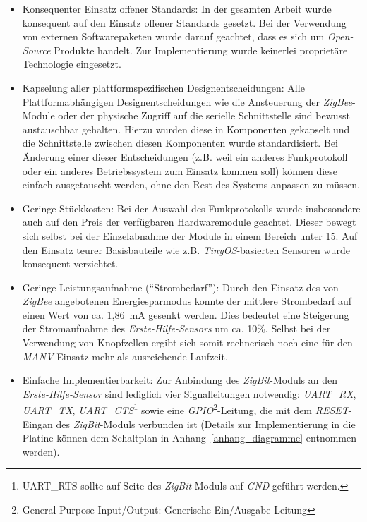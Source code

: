 \begin{itemize}
    \item{Konsequenter Einsatz offener Standards:} In der gesamten Arbeit wurde konsequent auf den
          Einsatz offener Standards gesetzt. Bei der Verwendung von externen Softwarepaketen wurde
          darauf geachtet, dass es sich um \emph{Open-Source} Produkte handelt. Zur Implementierung
          wurde keinerlei proprietäre Technologie eingesetzt.

    \item{Kapselung aller plattformspezifischen Designentscheidungen:} Alle Plattformabhängigen
          Designentscheidungen wie die Ansteuerung der \emph{ZigBee}-Module oder der
          physische Zugriff auf die serielle Schnittstelle sind bewusst austauschbar gehalten.
          Hierzu wurden diese in Komponenten gekapselt und die Schnittstelle zwischen diesen
          Komponenten wurde standardisiert. Bei Änderung einer dieser Entscheidungen (z.B.
          weil ein anderes Funkprotokoll oder ein anderes Betriebssystem zum Einsatz kommen soll)
          können diese einfach ausgetauscht werden, ohne den Rest des Systems anpassen zu 
          müssen.

    \item{Geringe Stückkosten:} Bei der Auswahl des Funkprotokolls wurde insbesondere auch auf den
          Preis der verfügbaren Hardwaremodule geachtet. Dieser bewegt sich selbst bei der
          Einzelabnahme der Module in einem Bereich unter 15\EUR{}. Auf den Einsatz teurer
          Basisbauteile wie z.B. \emph{TinyOS}-basierten Sensoren wurde konsequent verzichtet.

    \item{Geringe Leistungsaufnahme ("`Strombedarf"'):} Durch den Einsatz des von \emph{ZigBee}
          angebotenen Energiesparmodus konnte der mittlere Strombedarf auf einen Wert von ca. 
          1,86~mA gesenkt werden. Dies bedeutet eine Steigerung der Stromaufnahme des 
          \emph{Erste-Hilfe-Sensors} um ca. 10\%. Selbst bei der Verwendung von Knopfzellen ergibt
          sich somit rechnerisch noch eine für den \emph{MANV}-Einsatz mehr als ausreichende Laufzeit.

    \item{Einfache Implementierbarkeit:} Zur Anbindung des \emph{ZigBit}-Moduls an den \emph{Erste-Hilfe-Sensor}
          sind lediglich vier Signalleitungen notwendig: \emph{UART\_RX}, \emph{UART\_TX}, 
          \emph{UART\_CTS}\footnote{UART\_RTS sollte auf Seite des \emph{ZigBit}-Moduls auf \emph{GND}
              geführt werden.} sowie eine \emph{GPIO}\footnote{General Purpose Input/Output: 
              Generische Ein/Ausgabe-Leitung}-Leitung, 
              die mit dem \emph{RESET}-Eingan des
          \emph{ZigBit}-Moduls verbunden ist (Details zur Implementierung in die Platine können dem
          Schaltplan in Anhang~\ref{anhang_diagramme} entnommen werden). 


\end{itemize}
